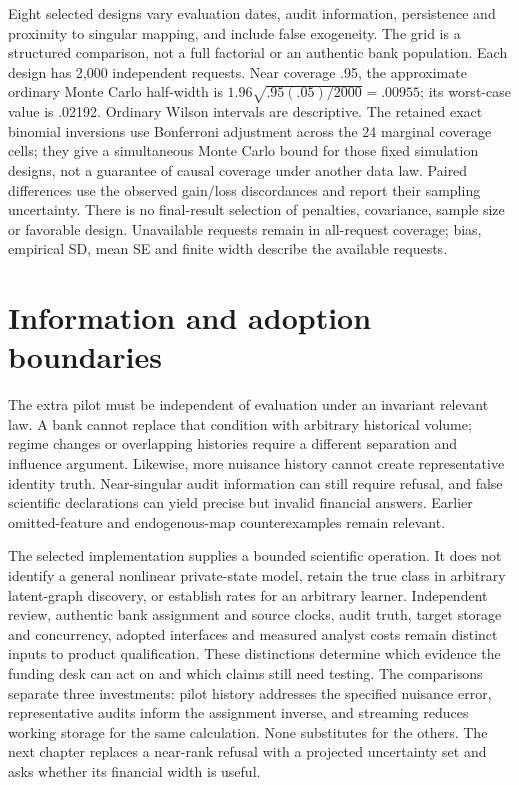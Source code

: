 Eight selected designs vary evaluation dates, audit information, persistence
and proximity to singular mapping, and include false exogeneity. The grid is
a structured comparison, not a full factorial or an authentic bank population.
Each design has 2,000 independent requests. Near coverage .95, the approximate
ordinary Monte Carlo half-width is
$1.96\sqrt{.95(.05)/2000}=.00955$; its worst-case value is .02192. Ordinary
Wilson intervals are descriptive. The retained exact binomial inversions use
Bonferroni adjustment across the 24 marginal coverage cells; they give a
simultaneous Monte Carlo bound for those fixed simulation designs, not a
guarantee of causal coverage under another data law. Paired differences use
the observed gain/loss discordances and report their sampling uncertainty.
There is no final-result selection of penalties, covariance, sample size or
favorable design. Unavailable requests remain in all-request coverage; bias,
empirical SD, mean SE and finite width describe the available requests.



\section{Information and adoption boundaries}
\label{v10:limits}

The extra pilot must be independent of evaluation under an invariant relevant
law. A bank cannot replace that condition with arbitrary historical volume;
regime changes or overlapping histories require a different separation and
influence argument. Likewise, more nuisance history cannot create representative
identity truth. Near-singular audit information can still require refusal, and
false scientific declarations can yield precise but invalid financial answers.
Earlier omitted-feature and endogenous-map counterexamples remain relevant.

The selected implementation supplies a bounded scientific operation. It does
not identify a general nonlinear private-state model, retain the true class in
arbitrary latent-graph discovery, or establish rates for an arbitrary learner.
Independent review, authentic bank assignment and source clocks, audit truth,
target storage and concurrency, adopted interfaces and measured analyst costs
remain distinct inputs to product qualification. These distinctions determine
which evidence the funding desk can act on and which claims still need testing. The comparisons separate three investments: pilot history addresses the specified nuisance error, representative audits inform the assignment inverse, and streaming reduces working storage for the same calculation. None substitutes for the others. The next chapter replaces a near-rank refusal with a projected uncertainty set and asks whether its financial width is useful.
